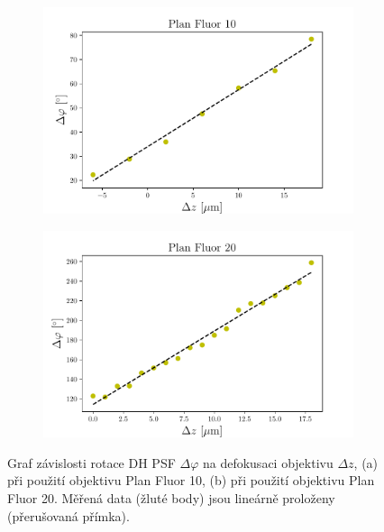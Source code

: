 \documentclass[12pt, a4paper,
oneside,      %
openany
]{report}
\begin{document}
	
	\begin{figure}[h!] \centering
		\begin{subfigure}[h]{0.63\textwidth} %
			\includegraphics[width=\textwidth]{image/vysledek_10} 
			\caption{} %
		\end{subfigure}
		\begin{subfigure}[h]{0.63\textwidth}
			\includegraphics[width=\textwidth]{image/vysledek_20}
			\caption{}
		\end{subfigure}
		\caption[Graf závislosti rotace DH PSF $\Delta\varphi$ na defokusaci objektivu $\Delta z$.]{Graf závislosti rotace DH PSF $\Delta\varphi$ na defokusaci objektivu $\Delta z$, (a) při použití objektivu Plan Fluor 10, (b) při použití objektivu Plan Fluor 20. Měřená data (žluté body) jsou lineárně proloženy (přerušovaná přímka). }
		\label{fig:rotace_grafy}
	\end{figure}
	
\end{document}
